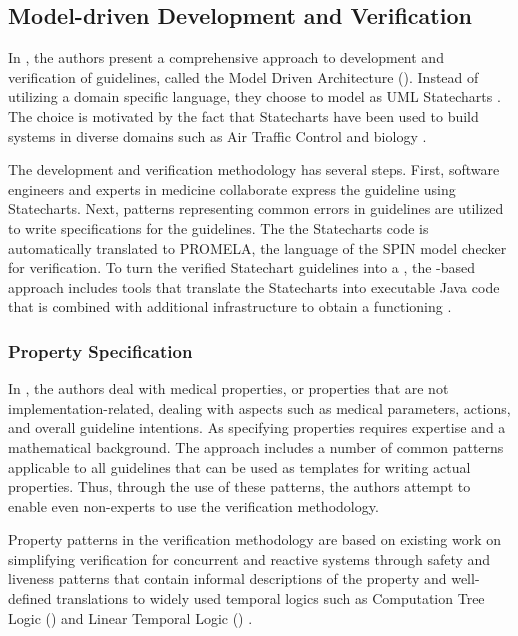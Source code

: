 \subsection{Model-driven Development and Verification}\label{sec:mda-verification}

In \cite{PerezJBI10}, the authors present a comprehensive approach
to development and verification of guidelines, called the Model Driven
Architecture (\MDA{}). Instead of
utilizing a domain specific language, they choose to model \BPGs{}
as UML Statecharts \cite{OMGSpecUrl}. The choice is motivated by
the fact that Statecharts have been used to build systems in diverse
domains such as Air Traffic Control \cite{WhittleICSE02} and biology
\cite{EfroniGR03}.

The development and verification methodology has several steps.
First, software engineers and experts in medicine collaborate
express the guideline using Statecharts. Next, patterns
representing common errors in guidelines are utilized to
write specifications for the guidelines. The
the Statecharts code is automatically translated to PROMELA,
the language of the SPIN model checker \cite{MikkISFST98} for verification.
To turn the verified Statechart guidelines into a \CDSS{}, the
\MDA{}-based approach includes tools that translate the Statecharts into
executable Java code that is combined with additional infrastructure to
obtain a functioning \CDSS{}.

\subsubsection{Property Specification}

In \cite{PerezJBI10}, the authors deal with
medical properties, or properties that are not implementation-related,
dealing with aspects such as  medical parameters, \HCP{} actions,
and overall guideline intentions. As specifying properties
requires expertise and a mathematical background. The \MDA{}
approach includes a number of common patterns applicable
to all guidelines that can be
used as templates for writing actual properties. Thus,
through the use of these patterns, the authors attempt
to enable even non-experts to use the \MDA{} verification
methodology.

Property patterns in the \MDA{} verification methodology
are based on existing work on simplifying verification for
concurrent and reactive systems through safety and liveness patterns
that contain informal descriptions of the property and
well-defined translations to widely used temporal logics such
as Computation Tree Logic (\CTL{}) and Linear Temporal Logic (\LTL{})
\cite{DwyerFM98,DwyerICSE98,BitschSAFECOMP01,RyndinaThesis05}.

